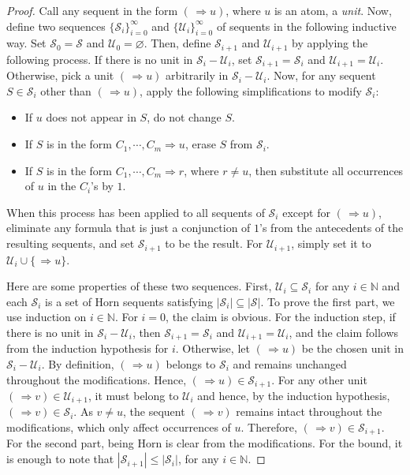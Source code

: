 \documentclass[10pt,a4paper]{amsart}
\begin{document}
\begin{proof}
Call any sequent in the form $(\, \Rightarrow u)$, where $u$ is an atom, a \emph{unit}. Now, define two sequences $\{\mathcal{S}_i\}_{i=0}^{\infty}$ and $\{\mathcal{U}_i\}_{i=0}^{\infty}$ of sequents in the following inductive way. Set $\mathcal{S}_0=\mathcal{S}$ and $\mathcal{U}_0=\varnothing$. Then, define $\mathcal{S}_{i+1}$ and $\mathcal{U}_{i+1}$ by applying the following process.
If there is no unit in $\mathcal{S}_i-\mathcal{U}_i$, set $\mathcal{S}_{i+1}=\mathcal{S}_{i}$ and $\mathcal{U}_{i+1}=\mathcal{U}_i$. Otherwise, pick a unit $(\, \Rightarrow u)$ arbitrarily in $\mathcal{S}_i-\mathcal{U}_i$. Now, for any sequent $S \in \mathcal{S}_i$ other than $(\, \Rightarrow u)$, apply the following simplifications to modify $\mathcal{S}_i$:
\begin{itemize}
\item[$(i)$] 
If $u$ does not appear in $S$, do not change $S$.
\item[$(ii)$] 
If $S$ is in the form $C_1, \cdots, C_m \Rightarrow u$, erase $S$ from $\mathcal{S}_i$.
\item[$(iii)$] 
If $S$ is in the form $C_1, \cdots, C_m \Rightarrow r$, where $r \neq u$, then substitute all occurrences of $u$ in the $C_i$'s by $1$.
\end{itemize}
When this process has been applied to all sequents of $\mathcal{S}_i$ except for $(\, \Rightarrow u)$, eliminate any formula that is just a conjunction of $1$'s from the antecedents of the resulting sequents, and set $\mathcal{S}_{i+1}$ to be the result. For $\mathcal{U}_{i+1}$, simply set it to $\mathcal{U}_i \cup \{\, \Rightarrow u\}$.

Here are some properties of these two sequences. First,
$\mathcal{U}_i \subseteq \mathcal{S}_i$ for any $i \in \mathbb{N}$ and each $\mathcal{S}_i$ is a set of Horn sequents satisfying $|\mathcal{S}_i|\subseteq |\mathcal{S}|$. To prove the first part, we use induction on $i \in \mathbb{N}$. For $i=0$, the claim is obvious. For the induction step, if there is no unit in $\mathcal{S}_i-\mathcal{U}_i$, then $\mathcal{S}_{i+1}=\mathcal{S}_{i}$ and $\mathcal{U}_{i+1}=\mathcal{U}_i$, and the claim follows from the induction hypothesis for $i$. Otherwise, let $(\, \Rightarrow u)$ be the chosen unit in $\mathcal{S}_i-\mathcal{U}_i$. By definition, $(\, \Rightarrow u)$ belongs to $\mathcal{S}_i$ and remains unchanged throughout the modifications. Hence, $(\, \Rightarrow u) \in \mathcal{S}_{i+1}$. For any other unit $(\, \Rightarrow v) \in \mathcal{U}_{i+1}$, it must belong to $\mathcal{U}_i$ and hence, by the induction hypothesis, $(\, \Rightarrow v) \in \mathcal{S}_i$. As $v \neq u$, the sequent $(\, \Rightarrow v)$ remains intact throughout the modifications, which only affect occurrences of $u$. Therefore, $(\, \Rightarrow v) \in \mathcal{S}_{i+1}$. For the second part, being Horn is clear from the modifications. For the bound, it is enough to note that $|\mathcal{S}_{i+1}| \leq |\mathcal{S}_i|$, for any $i\in \mathbb{N}$. 


\end{proof}
\end{document}
